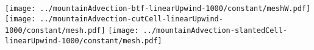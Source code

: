 \documentclass{article}
\begin{document}
\texttt{[image: ../mountainAdvection-btf-linearUpwind-1000/constant/meshW.pdf]}
\texttt{[image: ../mountainAdvection-cutCell-linearUpwind-1000/constant/mesh.pdf]}
\texttt{[image: ../mountainAdvection-slantedCell-linearUpwind-1000/constant/mesh.pdf]}
\end{document}
